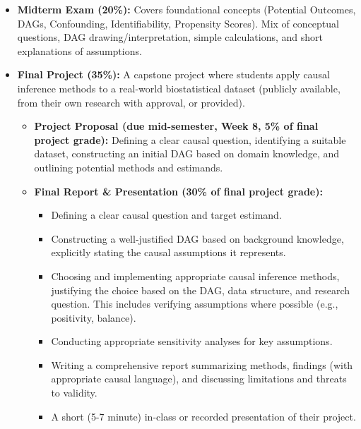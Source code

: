 \documentclass[10.5pt]{article}
\begin{document}
\begin{itemize}
\begin{itemize}
        \item \textbf{R Assignment 5 (associated with Week 12 concepts, due around Week 13/Finals Week):} Marginal Structural Models. Implementing a simple MSM using IPW (e.g., with \texttt{WeightIt} for weights and \texttt{geepack} or \texttt{survey} for robust standard errors), clearly stating sequential exchangeability and positivity assumptions.
    \end{itemize}
    \item \textbf{Midterm Exam (20\%):} Covers foundational concepts (Potential Outcomes, DAGs, Confounding, Identifiability, Propensity Scores). Mix of conceptual questions, DAG drawing/interpretation, simple calculations, and short explanations of assumptions.
    \item \textbf{Final Project (35\%):} A capstone project where students apply causal inference methods to a real-world biostatistical dataset (publicly available, from their own research with approval, or provided).
    \begin{itemize}
        \item \textbf{Project Proposal (due mid-semester, Week 8, 5\% of final project grade):} Defining a clear causal question, identifying a suitable dataset, constructing an initial DAG based on domain knowledge, and outlining potential methods and estimands.
        \item \textbf{Final Report \& Presentation (30\% of final project grade):}
        \begin{itemize}
            \item Defining a clear causal question and target estimand.
            \item Constructing a well-justified DAG based on background knowledge, explicitly stating the causal assumptions it represents.
            \item Choosing and implementing appropriate causal inference methods, justifying the choice based on the DAG, data structure, and research question. This includes verifying assumptions where possible (e.g., positivity, balance).
            \item Conducting appropriate sensitivity analyses for key assumptions.
            \item Writing a comprehensive report summarizing methods, findings (with appropriate causal language), and discussing limitations and threats to validity.
            \item A short (5-7 minute) in-class or recorded presentation of their project.
        \end{itemize}
    \end{itemize}
\end{itemize}
\end{document}
